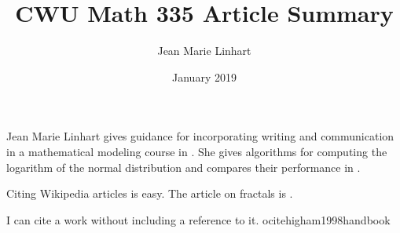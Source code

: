 \documentclass[12pt]{extarticle}
\title{CWU Math 335 Article Summary}
\author{Jean Marie Linhart}
\date{January 2019}
\begin{document}
\maketitle

Jean Marie Linhart gives guidance for incorporating writing and communication in a mathematical modeling course in \cite{Linhart2014}.  She gives algorithms for computing the logarithm of the normal distribution and compares their performance in \cite{Linhart2008}.

Citing Wikipedia articles is easy.  The article on fractals is \cite{fractalwiki}.

I can cite a work without including a reference to it.  
ocite{higham1998handbook}




\end{document}
